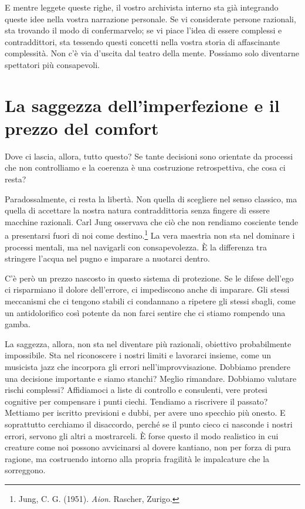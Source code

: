 E mentre leggete queste righe, il vostro archivista interno sta già integrando queste idee nella vostra narrazione personale. Se vi considerate persone razionali, sta trovando il modo di confermarvelo; se vi piace l'idea di essere complessi e contraddittori, sta tessendo questi concetti nella vostra storia di affascinante complessità. Non c'è via d'uscita dal teatro della mente. Possiamo solo diventarne spettatori più consapevoli.

\section{La saggezza dell'imperfezione e il prezzo del comfort}

Dove ci lascia, allora, tutto questo? Se tante decisioni sono orientate da processi che non controlliamo e la coerenza è una costruzione retrospettiva, che cosa ci resta?

Paradossalmente, ci resta la libertà. Non quella di scegliere nel senso classico, ma quella di accettare la nostra natura contraddittoria senza fingere di essere macchine razionali. Carl Jung osservava che ciò che non rendiamo cosciente tende a presentarsi fuori di noi come destino.\footnote{Jung, C. G. (1951). \textit{Aion}. Rascher, Zurigo.} La vera maestria non sta nel dominare i processi mentali, ma nel navigarli con consapevolezza. È la differenza tra stringere l'acqua nel pugno e imparare a nuotarci dentro.

C'è però un prezzo nascosto in questo sistema di protezione. Se le difese dell'ego ci risparmiano il dolore dell'errore, ci impediscono anche di imparare. Gli stessi meccanismi che ci tengono stabili ci condannano a ripetere gli stessi sbagli, come un antidolorifico così potente da non farci sentire che ci stiamo rompendo una gamba.

La saggezza, allora, non sta nel diventare più razionali, obiettivo probabilmente impossibile. Sta nel riconoscere i nostri limiti e lavorarci insieme, come un musicista jazz che incorpora gli errori nell'improvvisazione. Dobbiamo prendere una decisione importante e siamo stanchi? Meglio rimandare. Dobbiamo valutare rischi complessi? Affidiamoci a liste di controllo e consulenti, vere protesi cognitive per compensare i punti ciechi. Tendiamo a riscrivere il passato? Mettiamo per iscritto previsioni e dubbi, per avere uno specchio più onesto. E soprattutto cerchiamo il disaccordo, perché se il punto cieco ci nasconde i nostri errori, servono gli altri a mostrarceli. È forse questo il modo realistico in cui creature come noi possono avvicinarsi al dovere kantiano, non per forza di pura ragione, ma costruendo intorno alla propria fragilità le impalcature che la sorreggono.

